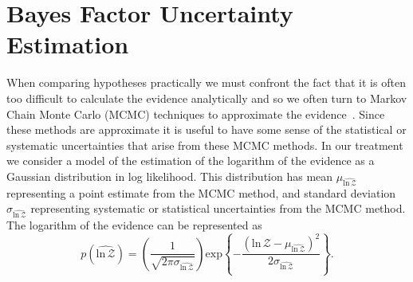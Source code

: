 \section{Bayes Factor Uncertainty Estimation}\label{sec:practical_bayes}
When comparing hypotheses practically we must confront the fact that it is often too difficult to calculate the evidence analytically and so we often turn to Markov Chain Monte Carlo (MCMC) techniques to approximate the evidence~\cite{kass1995bayes, read2006encyclopedia, hobson2010bayesian, wall2012practical}. Since these methods are approximate it is useful to have some sense of the statistical or systematic uncertainties that arise from these MCMC methods\cite{hobson2010bayesian}. In our treatment we consider a model of the estimation of the logarithm of the evidence as a Gaussian distribution in log likelihood. This distribution has mean $\mu_{\widehat{\mathrm{ln} \, \mathcal{Z}}}$ representing a point estimate from the MCMC method, and standard deviation $\sigma_{\widehat{\mathrm{ln} \, \mathcal{Z}}}$ representing systematic or statistical uncertainties from the MCMC method. The logarithm of the evidence can be represented as 
\begin{equation}\label{eqn:p_log_z}
    p(\widehat{\mathrm{ln} \, \mathcal{Z}}) = \left(\frac{1}{\sqrt{2 \pi \sigma_{\widehat{\mathrm{ln} \, \mathcal{Z}}}}} \right) \mathrm{exp} \left \{-\frac{\left(\mathrm{ln} \, \mathcal{Z} - \mu_{\widehat{\mathrm{ln} \, \mathcal{Z}}}\right)^2} {2 \sigma_{\widehat{\mathrm{ln} \, \mathcal{Z}}}}  \right\}.
\end{equation}

